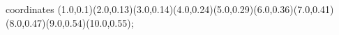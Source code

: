 					coordinates { (1.0,0.1)(2.0,0.13)(3.0,0.14)(4.0,0.24)(5.0,0.29)(6.0,0.36)(7.0,0.41)(8.0,0.47)(9.0,0.54)(10.0,0.55)};